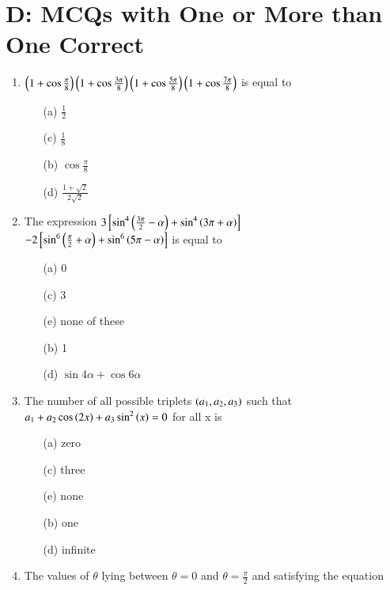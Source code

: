 \documentclass[journal,12pt,twocolumn,article]{IEEEtran}
\theoremstyle{remark}
\begin{document}
\section*{D: MCQs with One or More than One Correct}
\begin{enumerate}
\item $\left(1 + \cos\frac{\pi}{8}\right)\left(1 + \cos\frac{3\pi}{8}\right)\left(1 + \cos\frac{5\pi}{8}\right)\left(1 + \cos\frac{7\pi}{8}\right)$ is equal to
\hfill{}
\begin{multicols}{2}
\begin{enumerate}
\item[(a)] $\frac{1}{2}$
\item[(c)] $\frac{1}{8}$
\columnbreak
\item[(b)] $\cos \frac{\pi}{8}$
\item[(d)] $\frac{1+\sqrt{2}}{2\sqrt{2}}$
\end{enumerate}
\end{multicols}
\item The expression $3{}\left[\sin^4\left(\frac{3\pi}{2} - \alpha\right) + \sin^4\left(3\pi + \alpha\right)\right] $ \\ $- 2{}\left[\sin^6\left(\frac{\pi}{2} + \alpha\right) + \sin^6\left(5\pi - \alpha\right)\right]$ is equal to
\hfill{}
\begin{multicols}{2}
\begin{enumerate}
\item[(a)] 0
\item[(c)] 3
\item[(e)] none of these
\columnbreak
\item[(b)] 1
\item[(d)] $\sin4\alpha + \cos6\alpha$
\end{enumerate}
\end{multicols}
\item The number of all possible triplets $\left(a_1, a_2, a_3\right)$ such that $a_1 + a_2 \cos\left(2x\right) + a_3\sin^2\left(x\right) = 0$ for all x is
\hfill{}
\begin{multicols}{2}
\begin{enumerate}
\item[(a)] zero
\item[(c)] three
\item[(e)] none
\columnbreak
\item[(b)] one
\item[(d)] infinite
\end{enumerate}
\end{multicols}
\item The values of $\theta$ lying between $\theta = 0$ and $\theta = \frac{\pi}{2}$ and satisfying the equation

\end{enumerate}
\end{document}
